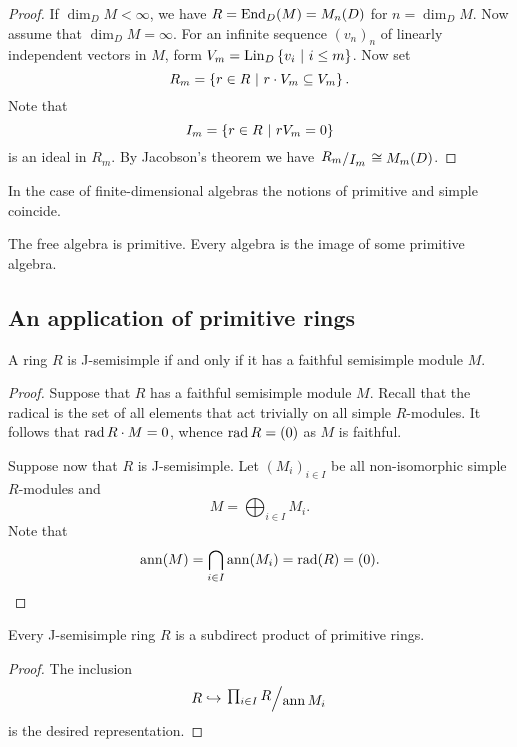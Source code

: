 \begin{proof}
If $\dim_D M < \infty$, we have $R = \operatorname{End}_D(M) = M_n(D)$ for
$n = \dim_D M$. Now assume that $\dim_D M = \infty$. For an
infinite sequence $(v_n)_n$ of linearly independent vectors in $M$,
form $V_m = \operatorname{Lin}_D \left\{v_i~\middle\vert~i \leq m\right\}$. Now set
\[
R_m = \left\{r \in R~\middle\vert~r \cdot V_m \subseteq V_m\right\}.
\]
Note that
\[
I_m = \left\{r \in R~\middle\vert~r V_m = 0\right\}
\]
is an ideal in $R_m$. By Jacobson's theorem we have
$\kvoc{R_m}{I_m} \cong M_m(D)$.
\end{proof}

\begin{opomba}
In the case of finite-dimensional algebras the notions of primitive
and simple coincide.
\end{opomba}

\begin{opomba}
The free algebra is primitive. Every algebra is the image of some
primitive algebra.
\end{opomba}

\newpage

\subsection{An application of primitive rings}

\begin{trditev}
A ring $R$ is J-semisimple if and only if it has a faithful
semisimple module $M$.
\end{trditev}

\begin{proof}
Suppose that $R$ has a faithful semisimple module $M$. Recall that
the radical is the set of all elements that act trivially on all
simple $R$-modules. It follows that $\operatorname{rad} R \cdot M = 0$, whence
$\operatorname{rad} R = (0)$ as $M$ is faithful.

Suppose now that $R$ is J-semisimple. Let $(M_i)_{i \in I}$ be all
non-isomorphic simple $R$-modules and
\[
M = \bigoplus_{i \in I} M_i.
\]
Note that
\[
\operatorname{ann}(M) = \bigcap_{i \in I} \operatorname{ann}(M_i) = \operatorname{rad}(R) = (0). \qedhere
\]
\end{proof}

\begin{posledica}\label{prim_ring:cl:prod_dec}
Every J-semisimple ring $R$ is a subdirect product of primitive
rings.
\end{posledica}

\begin{proof}
The inclusion
\[
R \hookrightarrow \kvoc{\prod_{i \in I} R}{\ann M_i}
\]
is the desired representation.
\end{proof}

